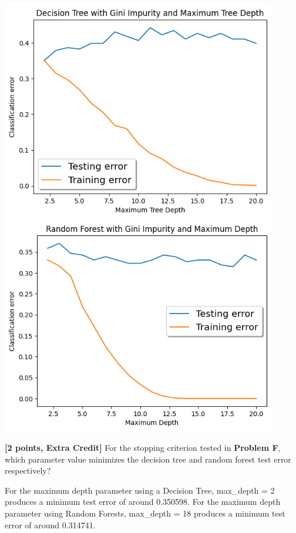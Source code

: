 \begin{solution}
    \\
    \includegraphics[width=12cm]{images/P2_A_ii.png} \\
    \includegraphics[width=12cm]{images/P2_C_ii.png} \\
\end{solution}

\problem\textbf{[2 points, Extra Credit] }For the stopping criterion tested in \textbf{Problem F}, which parameter value minimizes the decision tree and random forest test error respectively? 

\begin{solution}
    For the maximum depth parameter using a Decision Tree, max_depth = 2 produces a minimum test error of around 0.350598. For the maximum depth parameter using Random Forests, max_depth = 18 produces a minimum test error of around 0.314741.
\end{solution}

